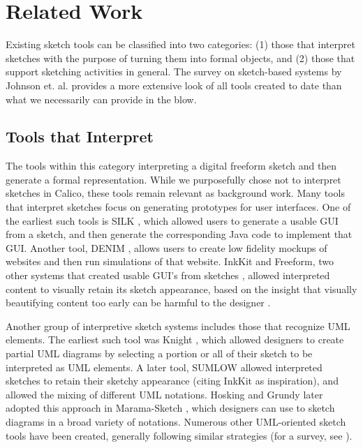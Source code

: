 \documentclass[12pt,fleqn]{ucithesis}
\begin{document}
 \newpage 
 \newpage \chapter{Related Work}
\label{chapter:related-work}

Existing sketch tools can be classified into two categories: (1) those that interpret sketches with the purpose of turning them into formal objects, and (2) those that support sketching activities in general. The survey on sketch-based systems by Johnson et. al. \citep{Johnson} provides a more extensive look of all tools created to date than what we necessarily can provide in the blow.

\section{Tools that Interpret}
\label{relatedwork:1}

The  tools within this category interpreting a digital freeform sketch and then generate a formal representation. While we purposefully chose not to interpret sketches in Calico, these tools remain relevant as background work.
Many tools that interpret sketches focus on generating prototypes for user interfaces. One of the earliest  such tools is SILK \citep{Landay}, which allowed users to generate a usable GUI from a sketch, and then generate the corresponding Java code to implement that GUI. Another tool, DENIM \citep{newman2003denim}, allows users to create low fidelity mockups of websites and then run simulations of that website.  InkKit and Freeform, two other systems that created usable GUI's from sketches \citep{chung2005inkkit,Plimmer}, allowed interpreted content to visually retain its sketch appearance, based on the insight that visually beautifying content too early can be harmful to the designer \citep{Shipman}. 

Another group of interpretive sketch systems includes those that recognize UML elements. The earliest such tool was Knight \citep{damm2000tool}, which allowed  designers to create partial UML diagrams by selecting a portion or all of their sketch to be interpreted as UML elements. A later tool, SUMLOW \citep{chen2008sumlow} allowed interpreted sketches to retain their sketchy appearance (citing InkKit as inspiration), and allowed the mixing of different UML notations. Hosking and Grundy later adopted this approach in Marama-Sketch \citep{Grundy}, which designers can use to sketch diagrams in a broad variety of notations. Numerous other UML-oriented sketch tools have been created, generally following similar strategies (for a survey, see \citep{Johnson} ). 
\end{document}

